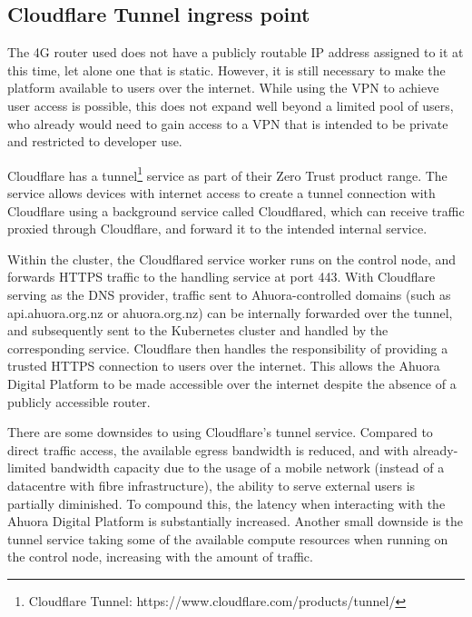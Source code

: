 \subsection{Cloudflare Tunnel ingress point}

The 4G router used does not have a publicly routable IP address assigned to it at this time, let alone one that is static. However, it is still necessary to make the platform available to users over the internet. While using the VPN to achieve user access is possible, this does not expand well beyond a limited pool of users, who already would need to gain access to a VPN that is intended to be private and restricted to developer use.

Cloudflare has a tunnel\footnote{Cloudflare Tunnel: https://www.cloudflare.com/products/tunnel/} service as part of their Zero Trust product range. The service allows devices with internet access to create a tunnel connection with Cloudflare using a background service called Cloudflared, which can receive traffic proxied through Cloudflare, and forward it to the intended internal service. 

Within the cluster, the Cloudflared service worker runs on the control node, and forwards HTTPS traffic to the handling service at port 443. With Cloudflare serving as the DNS provider, traffic sent to Ahuora-controlled domains (such as api.ahuora.org.nz or ahuora.org.nz) can be internally forwarded over the tunnel, and subsequently sent to the Kubernetes cluster and handled by the corresponding service. Cloudflare then handles the responsibility of providing a trusted HTTPS connection to users over the internet. This allows the Ahuora Digital Platform to be made accessible over the internet despite the absence of a publicly accessible router.

There are some downsides to using Cloudflare's tunnel service. Compared to direct traffic access, the available egress bandwidth is reduced, and with already-limited bandwidth capacity due to the usage of a mobile network (instead of a datacentre with fibre infrastructure), the ability to serve external users is partially diminished. To compound this, the latency when interacting with the Ahuora Digital Platform is substantially increased. Another small downside is the tunnel service taking some of the available compute resources when running on the control node, increasing with the amount of traffic.


